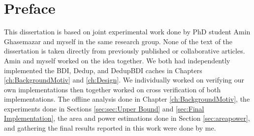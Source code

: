 
\chapter{Preface}

This dissertation is based on joint experimental work done by PhD student Amin Ghasemazar and myself in the same research group. None of the text of the dissertation is taken directly from previously published or collaborative articles.
Amin and myself worked on the idea together. We both had independently implemented the BDI, Dedup, and DedupBDI caches in Chapters \ref{ch:BackgroundMotiv} and \ref{ch:Design}. We individually worked on verifying our own implementations then together worked on cross verification of both implementations.
The offline analysis done in Chapter \ref{ch:BackgroundMotiv}, the experiments done in Sections \ref{sec:sec:Upper Bound} and \ref{sec:Final Implementation}, the area and power estimations done in Section \ref{sec:areapower}, and gathering the final results reported in this work were done by me.